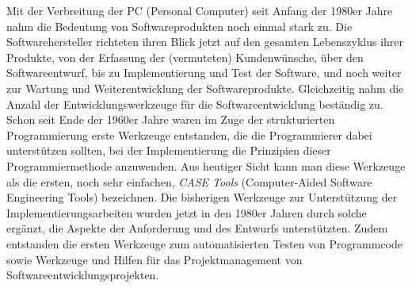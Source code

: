 

Mit der Verbreitung der PC (Personal Computer) seit Anfang der 1980er Jahre nahm die Bedeutung von Softwareprodukten noch einmal stark zu. Die Softwarehersteller richteten ihren Blick jetzt auf den gesamten Lebenszyklus ihrer Produkte, von der Erfassung der (vermuteten) Kundenwünsche, über den Softwareentwurf, bis zu Implementierung und Test der Software, und noch weiter zur Wartung und Weiterentwicklung der Softwareprodukte. Gleichzeitig nahm die Anzahl der Entwicklungswerkzeuge für die Softwareentwicklung beständig zu. Schon seit Ende der 1960er Jahre waren im Zuge der strukturierten Programmierung erste Werkzeuge entstanden, die die Programmierer dabei unterstützen sollten, bei der Implementierung die Prinzipien dieser Programmiermethode anzuwenden. Aus heutiger Sicht kann man diese Werkzeuge als die ersten, noch sehr einfachen, \textit{CASE Tools} 
(Computer-Aided Software Engineering Tools) bezeichnen. Die bisherigen Werkzeuge zur Unterstützung der Implementierungsarbeiten wurden jetzt in den 1980er Jahren durch solche ergänzt, die Aspekte der Anforderung und des Entwurfs unterstützten. Zudem entstanden die ersten Werkzeuge zum automatisierten Testen von Programmcode sowie Werkzeuge und Hilfen für das Projektmanagement von Softwareentwicklungsprojekten.

